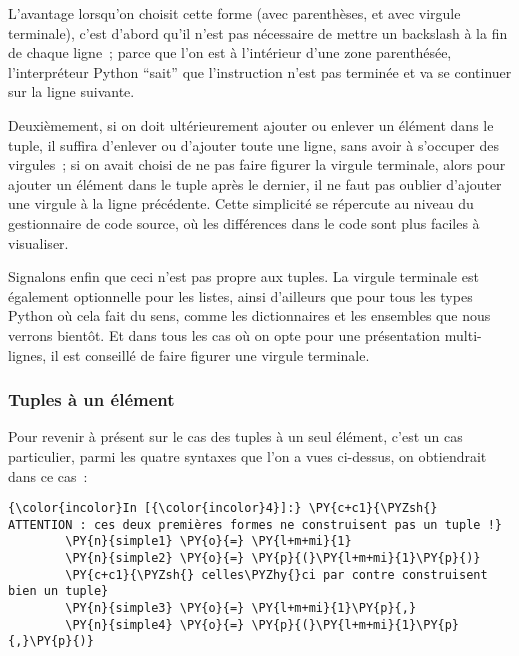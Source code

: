    L'avantage lorsqu'on choisit cette forme (avec parenthèses, et avec
virgule terminale), c'est d'abord qu'il n'est pas nécessaire de mettre
un backslash à la fin de chaque ligne~; parce que l'on est à l'intérieur
d'une zone parenthésée, l'interpréteur Python ``sait'' que l'instruction
n'est pas terminée et va se continuer sur la ligne suivante.

Deuxièmement, si on doit ultérieurement ajouter ou enlever un élément
dans le tuple, il suffira d'enlever ou d'ajouter toute une ligne, sans
avoir à s'occuper des virgules~; si on avait choisi de ne pas faire
figurer la virgule terminale, alors pour ajouter un élément dans le
tuple après le dernier, il ne faut pas oublier d'ajouter une virgule à
la ligne précédente. Cette simplicité se répercute au niveau du
gestionnaire de code source, où les différences dans le code sont plus
faciles à visualiser.

Signalons enfin que ceci n'est pas propre aux tuples. La virgule
terminale est également optionnelle pour les listes, ainsi d'ailleurs
que pour tous les types Python où cela fait du sens, comme les
dictionnaires et les ensembles que nous verrons bientôt. Et dans tous
les cas où on opte pour une présentation multi-lignes, il est conseillé
de faire figurer une virgule terminale.

    \hypertarget{tuples-uxe0-un-uxe9luxe9ment}{%
\subsubsection{Tuples à un élément}\label{tuples-uxe0-un-uxe9luxe9ment}}

    Pour revenir à présent sur le cas des tuples à un seul élément, c'est un
cas particulier, parmi les quatre syntaxes que l'on a vues ci-dessus, on
obtiendrait dans ce cas~:

    \begin{Verbatim}[commandchars=\\\{\},frame=single,framerule=0.3mm,rulecolor=\color{cellframecolor}]
{\color{incolor}In [{\color{incolor}4}]:} \PY{c+c1}{\PYZsh{} ATTENTION : ces deux premières formes ne construisent pas un tuple !}
        \PY{n}{simple1} \PY{o}{=} \PY{l+m+mi}{1}
        \PY{n}{simple2} \PY{o}{=} \PY{p}{(}\PY{l+m+mi}{1}\PY{p}{)}
        \PY{c+c1}{\PYZsh{} celles\PYZhy{}ci par contre construisent bien un tuple}
        \PY{n}{simple3} \PY{o}{=} \PY{l+m+mi}{1}\PY{p}{,}
        \PY{n}{simple4} \PY{o}{=} \PY{p}{(}\PY{l+m+mi}{1}\PY{p}{,}\PY{p}{)}
\end{Verbatim}


